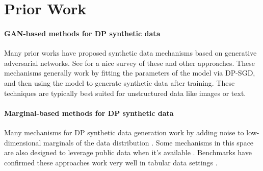 \section{Prior Work}
\label{sec:prior_work}

\paragraph{GAN-based methods for DP synthetic data}

Many prior works have proposed synthetic data mechanisms based on generative adversarial networks.  See \cite{yang2024tabular} for a nice survey of these and other approaches.  These mechanisms generally work by fitting the parameters of the model via DP-SGD, and then using the model to generate synthetic data after training.  These techniques are typically best suited for unstructured data like images or text.

\paragraph{Marginal-based methods for DP synthetic data}

Many mechanisms for DP synthetic data generation work by adding noise to low-dimensional marginals of the data distribution \cite{mckenna2021winning,mckenna2022aim,cai2021data,aydore2021differentially,fuentes2024joint,vietri2022private,liu2021iterative,liu2021leveraging,zhang2021privsyn}.  Some mechanisms in this space are also designed to leverage public data when it's available \cite{fuentes2024joint,liu2021iterative,liu2021leveraging}.  Benchmarks have confirmed these approaches work very well in tabular data settings \cite{tao2021benchmarking}.


